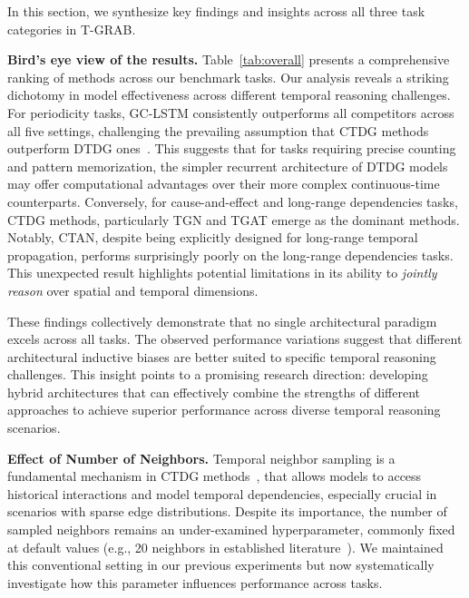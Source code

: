 In this section, we synthesize key findings and insights across all three task categories in T-GRAB.

\textbf{Bird's eye view of the results.} Table~\ref{tab:overall} presents a comprehensive ranking of methods across our benchmark tasks. 
Our analysis reveals a striking dichotomy in model effectiveness across different temporal reasoning challenges. For periodicity tasks, GC-LSTM consistently outperforms all competitors across all five settings, challenging the prevailing assumption that CTDG methods outperform DTDG ones~\cite{huangutg}. This suggests that for tasks requiring precise counting and pattern memorization, the simpler recurrent architecture of DTDG models may offer computational advantages over their more complex continuous-time counterparts. Conversely, for cause-and-effect and long-range dependencies tasks, CTDG methods, particularly TGN and TGAT emerge as the dominant methods. Notably, CTAN, despite being explicitly designed for long-range temporal propagation, performs surprisingly poorly on the long-range dependencies tasks. This unexpected result highlights potential limitations in its ability to \textit{jointly reason} over spatial and temporal dimensions.

 These findings collectively demonstrate that no single architectural paradigm excels across all \benchmarkname tasks. The observed performance variations suggest that different architectural inductive biases are better suited to specific temporal reasoning challenges. This insight points to a promising research direction: developing hybrid architectures that can effectively combine the strengths of different approaches to achieve superior performance across diverse temporal reasoning scenarios.

 \textbf{Effect of Number of Neighbors.} Temporal neighbor sampling is a fundamental mechanism in CTDG methods~\cite{dygformer,tgn,tgat,luo2022neighborhood}, that allows  models to access historical interactions and model temporal dependencies, especially crucial in scenarios with sparse edge distributions. Despite its importance, the number of sampled neighbors remains an under-examined hyperparameter, commonly fixed at default values (e.g., 20 neighbors in established literature~\cite{dygformer}). We maintained this conventional setting in our previous experiments but now systematically investigate how this parameter influences performance across \benchmarkname tasks.

